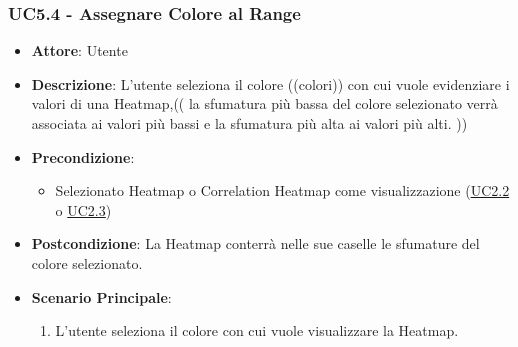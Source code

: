     \subsubsection{UC5.4 - Assegnare Colore al Range}
    \label{uc5.4}
    
    \begin{itemize}
    \item \textbf{Attore}: Utente
    \item \textbf{Descrizione}: L'utente seleziona il colore ((colori)) con cui vuole evidenziare i valori di una Heatmap,(( la sfumatura più bassa del colore selezionato verrà associata ai valori più bassi e la sfumatura più alta ai valori più alti. ))
    \item \textbf{Precondizione}: 
    \begin{itemize}
        \item Selezionato Heatmap o Correlation Heatmap come visualizzazione (\hyperref[uc2.2]{UC2.2} o \hyperref[uc2.3]{UC2.3})
    \end{itemize}  
    \item \textbf{Postcondizione}: La Heatmap conterrà nelle sue caselle le sfumature del colore selezionato.
    \item \textbf{Scenario Principale}: 
    \begin{enumerate}
        \item L'utente seleziona il colore con cui vuole visualizzare la Heatmap.
    \end{enumerate}  
    \end{itemize}